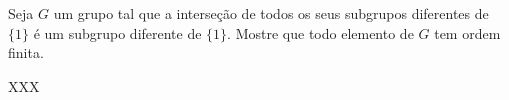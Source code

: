 \begin{homeworkProblem}
Seja $G$ um grupo tal que a interseção de todos os seus subgrupos diferentes de $\{1\}$ é um subgrupo diferente de $\{1\}$. Mostre que todo elemento de $G$ tem ordem finita.
  \begin{solution}
    XXX
  \end{solution}
\end{homeworkProblem}
